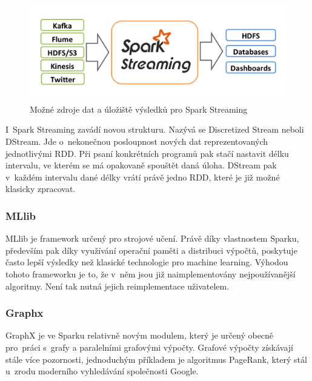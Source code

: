 \documentclass[thesis=B,czech]{FITthesis}[2012/06/26]
\begin{document}
	\begin{figure}[ht]
    	\centering
    	\includegraphics[width=1\textwidth]{images/spark-streaming-arch.png}
    	\caption{Možné zdroje dat a úložiště výsledků pro Spark Streaming\cite{streaming-guide}}
    	\label{fig:spark_streaming_arch}
	\end{figure}
	
	I~Spark Streaming zavádí novou strukturu. Nazývá se Discretized Stream neboli DStream. Jde o~nekonečnou posloupnost nových dat reprezentovaných jednotlivými RDD. Při psaní konkrétních programů pak stačí nastavit délku intervalu, ve kterém se má opakovaně spouštět daná úloha. DStream pak v~každém intervalu dané délky vrátí právě jedno RDD, které je již možné klasicky zpracovat. 
	

\subsubsection{MLlib}
	MLlib je framework určený pro strojové učení. Právě díky vlastnostem Sparku, především pak díky využívání operační paměti a distribuci výpočtů, poskytuje často lepší výsledky než klasické technologie pro machine learning\cite{MLlib}. Výhodou tohoto frameworku je to, že v~něm jsou již naimplementovány nejpoužívanější algoritmy. Není tak nutná jejich reimplementace uživatelem. 

	
\subsubsection{Graphx}
	GraphX je ve Sparku relativně novým modulem, který je určený obecně pro~práci s~grafy a paralelními grafovými výpočty. Grafové výpočty získávají stále více pozornosti, jednoduchým příkladem je algoritmus PageRank, který stál u~zrodu moderního vyhledávání společnosti Google\cite{google-pagerank}. 
	


\end{document}
